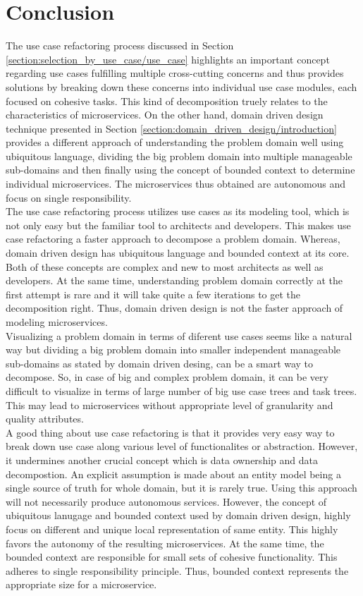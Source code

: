 \section{Conclusion}\label{section:modeling_microservices/conclusion}
The use case refactoring process discussed in Section \ref{section:selection_by_use_case/use_case} highlights an important concept regarding use cases fulfilling multiple cross-cutting concerns and thus provides solutions by breaking down these concerns into individual use case modules, each focused on cohesive tasks. This kind of decomposition truely relates to the characteristics of microservices. On the other hand, domain driven design technique presented in Section \ref{section:domain_driven_design/introduction} provides a different approach of understanding the problem domain well using ubiquitous language, dividing the big problem domain into multiple manageable sub-domains and then finally using the concept of bounded context to determine individual microservices. The microservices thus obtained are autonomous and focus on single responsibility.\\
The use case refactoring process utilizes use cases as its modeling tool, which is not only easy but the familiar tool to architects and developers. This makes use case refactoring a faster approach to decompose a problem domain. Whereas, domain driven design has ubiquitous language and bounded context at its core. Both of these concepts are complex and new to most architects as well as developers. At the same time, understanding problem domain correctly at the first attempt is rare and it will take quite a few iterations to get the decomposition right. Thus, domain driven design is not the faster approach of modeling microservices.\\
Visualizing a problem domain in terms of diferent use cases seems like a natural way but dividing a big problem domain into smaller independent manageable sub-domains as stated by domain driven desing, can be a smart way to decompose. So, in case of big and complex problem domain, it can be very difficult to visualize in terms of large number of big use case trees and task trees. This may lead to microservices without appropriate level of granularity and quality attributes.\\
A good thing about use case refactoring is that it provides very easy way to break down use case along various level of functionalites or abstraction. However, it undermines another crucial concept which is data ownership and data decompostion. An explicit assumption is made about an entity model being a single source of truth for whole domain, but it is rarely true. Using this approach will not necessarily produce autonomous services. However, the concept of ubiquitous lanugage and bounded context used by domain driven design, highly focus on different and unique local representation of same entity. This highly favors the autonomy of the resulting microservices. At the same time, the bounded context are responsible for small sets of cohesive functionality. This adheres to single responsibility principle. Thus, bounded context represents the appropriate size for a microservice.

